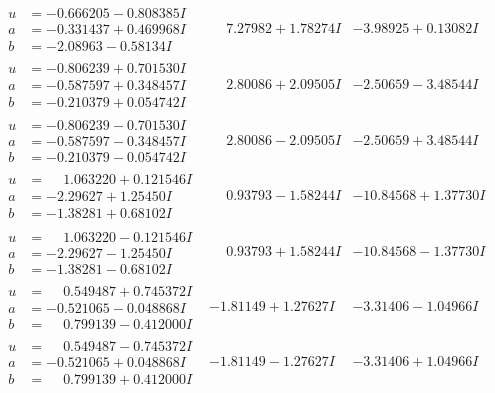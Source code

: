 \documentclass[1p]{elsarticle_modified}
\theoremstyle{definition}
\begin{document}
$$\begin{array}{c|c|c}
\begin{aligned}
u &= -0.666205 - 0.808385 I \\
a &= -0.331437 + 0.469968 I \\
b &= -2.08963 - 0.58134 I\end{aligned}
 & \phantom{-}7.27982 + 1.78274 I & -3.98925 + 0.13082 I \\ \hline\begin{aligned}
u &= -0.806239 + 0.701530 I \\
a &= -0.587597 + 0.348457 I \\
b &= -0.210379 + 0.054742 I\end{aligned}
 & \phantom{-}2.80086 + 2.09505 I & -2.50659 - 3.48544 I \\ \hline\begin{aligned}
u &= -0.806239 - 0.701530 I \\
a &= -0.587597 - 0.348457 I \\
b &= -0.210379 - 0.054742 I\end{aligned}
 & \phantom{-}2.80086 - 2.09505 I & -2.50659 + 3.48544 I \\ \hline\begin{aligned}
u &= \phantom{-}1.063220 + 0.121546 I \\
a &= -2.29627 + 1.25450 I \\
b &= -1.38281 + 0.68102 I\end{aligned}
 & \phantom{-}0.93793 - 1.58244 I & -10.84568 + 1.37730 I \\ \hline\begin{aligned}
u &= \phantom{-}1.063220 - 0.121546 I \\
a &= -2.29627 - 1.25450 I \\
b &= -1.38281 - 0.68102 I\end{aligned}
 & \phantom{-}0.93793 + 1.58244 I & -10.84568 - 1.37730 I \\ \hline\begin{aligned}
u &= \phantom{-}0.549487 + 0.745372 I \\
a &= -0.521065 - 0.048868 I \\
b &= \phantom{-}0.799139 - 0.412000 I\end{aligned}
 & -1.81149 + 1.27627 I & -3.31406 - 1.04966 I \\ \hline\begin{aligned}
u &= \phantom{-}0.549487 - 0.745372 I \\
a &= -0.521065 + 0.048868 I \\
b &= \phantom{-}0.799139 + 0.412000 I\end{aligned}
 & -1.81149 - 1.27627 I & -3.31406 + 1.04966 I \\ \hline\begin{aligned}

\end{aligned}
\end{array}$$
\end{document}
